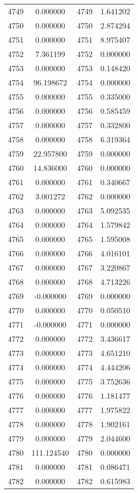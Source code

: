 \documentclass[12pt]{article}
\begin{document}
\begin{longtable}{@{}cccc@{}}
4749 & 0.000000 & 4749 & 1.641202 \\
4750 & 0.000000 & 4750 & 2.874294 \\
4751 & 0.000000 & 4751 & 8.975407 \\
4752 & 7.361199 & 4752 & 0.000000 \\
4753 & 0.000000 & 4753 & 0.148420 \\
4754 & 96.198672 & 4754 & 0.000000 \\
4755 & 0.000000 & 4755 & 0.335000 \\
4756 & 0.000000 & 4756 & 0.585459 \\
4757 & 0.000000 & 4757 & 0.332800 \\
4758 & 0.000000 & 4758 & 6.319364 \\
4759 & 22.957800 & 4759 & 0.000000 \\
4760 & 14.836000 & 4760 & 0.000000 \\
4761 & 0.000000 & 4761 & 0.340667 \\
4762 & 3.001272 & 4762 & 0.000000 \\
4763 & 0.000000 & 4763 & 5.092535 \\
4764 & 0.000000 & 4764 & 1.579842 \\
4765 & 0.000000 & 4765 & 1.595008 \\
4766 & 0.000000 & 4766 & 4.016101 \\
4767 & 0.000000 & 4767 & 3.220867 \\
4768 & 0.000000 & 4768 & 4.713226 \\
4769 & -0.000000 & 4769 & 0.000000 \\
4770 & 0.000000 & 4770 & 0.050510 \\
4771 & -0.000000 & 4771 & 0.000000 \\
4772 & 0.000000 & 4772 & 3.436617 \\
4773 & 0.000000 & 4773 & 4.651210 \\
4774 & 0.000000 & 4774 & 4.444206 \\
4775 & 0.000000 & 4775 & 3.752636 \\
4776 & 0.000000 & 4776 & 1.181477 \\
4777 & 0.000000 & 4777 & 1.975822 \\
4778 & 0.000000 & 4778 & 1.902161 \\
4779 & 0.000000 & 4779 & 2.044600 \\
4780 & 111.124540 & 4780 & 0.000000 \\
4781 & 0.000000 & 4781 & 0.086471 \\
4782 & 0.000000 & 4782 & 0.615983 \\

\end{longtable}
\end{document}
